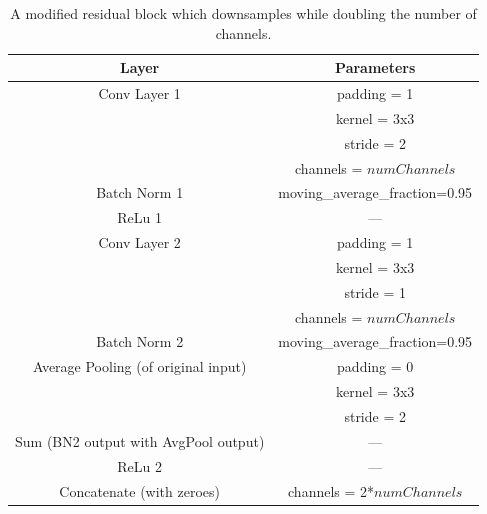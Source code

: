 \documentclass{article}
\begin{document}
	\begin{table}[tbh]
		\begin{center}
			\caption{A modified residual block which downsamples while doubling the number of channels.}
			\begin{tabular}{| c | c | }
				\hline
				Layer & Parameters \\
				\hline \hline
				Conv Layer 1 & padding = 1 \\
				& kernel = 3x3 \\
				& stride = 2 \\
				& channels = $numChannels$ \\
				\hline
				Batch Norm 1 & moving\_average\_fraction=0.95 \\
				\hline
				ReLu 1 & --- \\
				\hline
				Conv Layer 2 & padding = 1 \\
				& kernel = 3x3 \\
				& stride = 1 \\
				& channels = $numChannels$ \\
				\hline
				Batch Norm 2 & moving\_average\_fraction=0.95 \\
				\hline
				Average Pooling (of original input) & padding = 0 \\
				& kernel = 3x3 \\
				& stride = 2 \\
				\hline
				Sum (BN2 output with AvgPool output) & --- \\
				\hline
				ReLu 2 & --- \\
				\hline
				Concatenate (with zeroes) & channels = 2*$numChannels$ \\
				\hline
			\end{tabular}
			\label{table:resnet56_transition}
		\end{center}
	\end{table}
	
\end{document}
